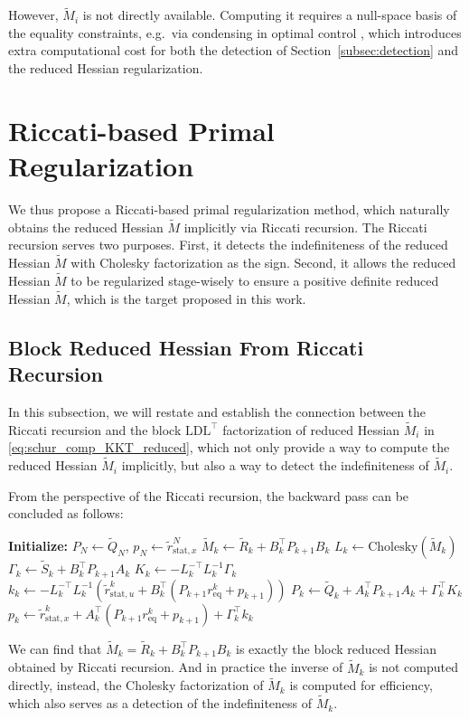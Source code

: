 \documentclass[class=scrbook, crop=false]{standalone}
\begin{document}
However, $\tilde{M}_i$ is not directly available.
Computing it requires a null-space basis of the equality constraints,
e.g.\ via condensing in optimal control \cite{frisonEfficientImplementationPartial2016},
which introduces extra computational cost
for both the detection of Section~\ref{subsec:detection} and the reduced Hessian regularization.

\section{Riccati-based Primal Regularization}
\label{sec:riccati_primal_reg}
We thus propose a Riccati-based primal regularization method, 
which naturally obtains the reduced Hessian $\tilde{M}$ implicitly via Riccati recursion.
The Riccati recursion serves two purposes.
First, it detects the indefiniteness of the reduced Hessian $\tilde{M}$ with Cholesky factorization as the sign.
Second, it allows the reduced Hessian $\tilde{M}$ to be regularized stage-wisely to 
ensure a positive definite reduced Hessian $\tilde{M}$, which is the target proposed in this work.

\subsection{Block Reduced Hessian From Riccati Recursion}
\label{subsec:block_reduced_hessian}
In this subsection, we will restate and establish the connection between
the Riccati recursion and the block $\mathrm{LD}\mathrm{L}^\top$ factorization of reduced Hessian $\tilde{M}_i$ in \eqref{eq:schur_comp_KKT_reduced},
which not only provide a way to compute the reduced Hessian $\tilde{M}_i$ implicitly, but also a way to detect the indefiniteness of $\tilde{M}_i$.

From the perspective of the Riccati recursion, the backward pass can be concluded as follows:
\begin{algorithm}[H]
\caption{Backward Pass of Riccati Recursion}
\label{alg:riccati_recursion_backward}
\begin{algorithmic}[1]
\State\textbf{Initialize:} $P_N \gets \tilde{Q}_N$, $p_N \gets \tilde{r}_{\mathrm{stat}, x}^N$
\Statex 
{}
    \State $\tilde{M}_k \gets \tilde{R}_k + B_k^\top P_{k+1} B_k$
    \State $L_k \gets \mathrm{Cholesky}(\tilde{M}_k)$
    \State $\Gamma_k \gets \tilde{S}_k + B_k^\top P_{k+1} A_k$
    \Statex
    \State $K_k \gets -L_k^{-\top} L_k^{-1} \Gamma_k$
    \State $k_k \gets -L_k^{-\top} L_k^{-1} \left(\tilde{r}_{\mathrm{stat}, u}^k + B_k^\top (P_{k+1} r_{\mathrm{eq}}^k + p_{k+1})\right)$
    \Statex
    \State $P_k \gets \tilde{Q}_k + A_k^\top P_{k+1} A_k + \Gamma_k^\top K_k$
    \State $p_k \gets \tilde{r}_{\mathrm{stat}, x}^k + A_k^\top (P_{k+1} r_{\mathrm{eq}}^k + p_{k+1}) + \Gamma_k^\top k_k$
\EndFor
\end{algorithmic}
\end{algorithm}
We can find that $\tilde{M}_k = \tilde{R}_k + B_k^\top P_{k+1} B_k$ is exactly the block reduced Hessian obtained by Riccati recursion.
And in practice the inverse of $\tilde{M}_k$ is not computed directly,
instead, the Cholesky factorization of $\tilde{M}_k$ is computed for efficiency, which also serves as a detection of the indefiniteness of $\tilde{M}_k$.
\end{document}
